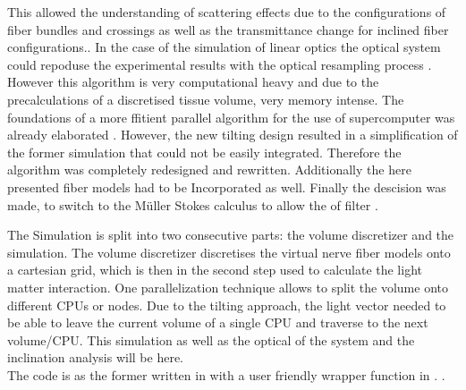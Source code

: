 This allowed the understanding of scattering effects due to the configurations of fiber bundles and crossings as well as the transmittance change for inclined fiber configurations.\cite{MenzelDissertation,Menzel2020,Menzel2021}.
%  
In the case of the simulation of linear optics the optical system could repoduse the experimental results with \eg{} the optical resampling process \cite{Dohmen2015,Menzel2016}.
However this algorithm is very computational heavy and due to the precalculations of a discretised tissue volume, very memory intense.
The foundations of a more ffitient parallel algorithm for the use of supercomputer was already elaborated \cite{Lucksch2016}.
However, the new tilting design resulted in a simplification of the former simulation that could not be easily integrated.
Therefore the algorithm was completely redesigned and rewritten.
Additionally the here presented fiber models had to be Incorporated as well.
Finally the descision was made, to switch to the M\"uller Stokes calculus to allow the \dummy{} of filter \dummy{}.
% 
\par
% 
The Simulation is split into two consecutive parts: the volume discretizer and the simulation.
The volume discretizer discretises the virtual nerve fiber models onto a cartesian grid, which is then in the second step used to calculate the light matter interaction.
One parallelization technique allows to split the volume onto different \acp{CPU} or nodes.
Due to the tilting approach, the light vector needed to be able to leave the current volume of a single \ac{CPU} and traverse to the next volume/\ac{CPU}.
This simulation as well as the optical \dummy{} of the system and the inclination analysis will be \dummy{} here.
\\
% 
The code is as the former written in \cpp{} with a user friendly wrapper function in \python{}.
% 
.
% 
% 
